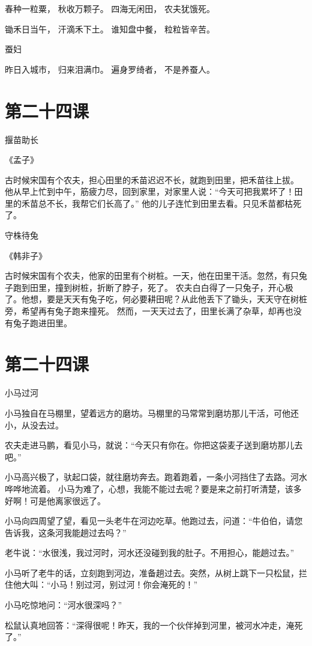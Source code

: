 \documentclass[12pt,UTF8]{ctexbook}
\begin{document}
春种一粒粟，
秋收万颗子。
四海无闲田，
农夫犹饿死。

锄禾日当午，
汗滴禾下土。
谁知盘中餐，
粒粒皆辛苦。

蚕妇

昨日入城市，
归来泪满巾。
遍身罗绮者，
不是养蚕人。

\section{第二十四课}

揠苗助长

《孟子》

古时候宋国有个农夫，担心田里的禾苗迟迟不长，就跑到田里，把禾苗往上拔。
他从早上忙到中午，筋疲力尽，回到家里，对家里人说：“今天可把我累坏了！田里的禾苗总不长，我帮它们长高了。”
他的儿子连忙到田里去看。只见禾苗都枯死了。

守株待兔

《韩非子》

古时候宋国有个农夫，他家的田里有个树桩。一天，他在田里干活。忽然，有只兔子跑到田里，撞到树桩，折断了脖子，死了。
农夫白白得了一只兔子，开心极了。他想，要是天天有兔子吃，何必要耕田呢？从此他丢下了锄头，天天守在树桩旁，希望再有兔子跑来撞死。
然而，一天天过去了，田里长满了杂草，却再也没有兔子跑进田里。

\section{第二十四课}

小马过河

小马独自在马棚里，望着远方的磨坊。马棚里的马常常到磨坊那儿干活，可他还小，从没去过。

农夫走进马鹏，看见小马，就说：“今天只有你在。你把这袋麦子送到磨坊那儿去吧。”

小马高兴极了，驮起口袋，就往磨坊奔去。跑着跑着，一条小河挡住了去路。河水哗哗地流着。
小马为难了，心想，我能不能过去呢？要是来之前打听清楚，该多好啊！可是他离家很远了。

小马向四周望了望，看见一头老牛在河边吃草。他跑过去，问道：“牛伯伯，请您告诉我，这条河我能趟过去吗？”

老牛说：“水很浅，我过河时，河水还没碰到我的肚子。不用担心，能趟过去。”

小马听了老牛的话，立刻跑到河边，准备趟过去。突然，从树上跳下一只松鼠，拦住他大叫：“小马！别过河，别过河！你会淹死的！”

小马吃惊地问：“河水很深吗？”

松鼠认真地回答：“深得很呢！昨天，我的一个伙伴掉到河里，被河水冲走，淹死了。”
\end{document}
